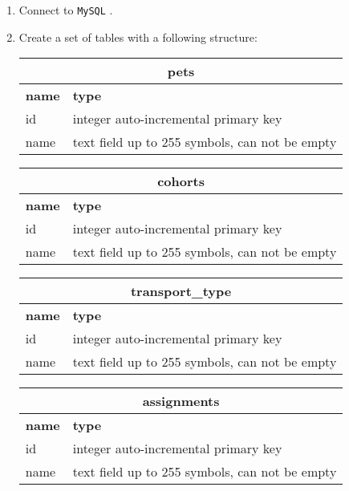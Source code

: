 \documentclass[12pt]{article}
\newcommand{\code}[1]{\texttt{#1}}
\begin{document}
\begin{enumerate}
\item Connect to \code{MySQL} .
\item Create a set of tables with a following structure:

\begin{tabular}{| l | l | }
  \hline
  \multicolumn{2}{|c|}{\textbf{pets}}  \\
  \hline
  \textbf{name} & \textbf{type} \\
  \hline
  id & integer auto-incremental primary key \\
  name & text field up to 255 symbols, can not be empty \\
  \hline
\end{tabular}

\begin{tabular}{| l | l |}
  \hline
  \multicolumn{2}{|c|}{\textbf{cohorts}}  \\
  \hline
  \textbf{name} & \textbf{type} \\
  \hline
  id & integer auto-incremental primary key \\
  name & text field up to 255 symbols, can not be empty \\
  \hline
\end{tabular}

\begin{tabular}{| l | l |}
  \hline
  \multicolumn{2}{|c|}{\textbf{transport\_type}}  \\
  \hline
  \textbf{name} & \textbf{type} \\
  \hline
  id & integer auto-incremental primary key \\
  name & text field up to 255 symbols, can not be empty \\
  \hline
\end{tabular}

\begin{tabular}{| l | l | }
  \hline
  \multicolumn{2}{|c|}{\textbf{assignments}}  \\
  \hline
  \textbf{name} & \textbf{type} \\
  \hline
  id & integer auto-incremental primary key \\
  name & text field up to 255 symbols, can not be empty \\
  \hline
\end{tabular}


\end{enumerate}
\end{document}
